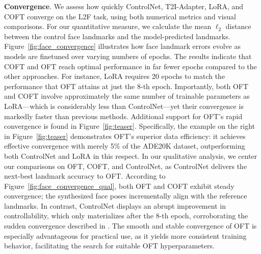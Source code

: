 \textbf{Convergence}. We assess how quickly ControlNet, T2I-Adapter, LoRA, and COFT converge on the L2F task, using both numerical metrics and visual comparisons. For our quantitative measure, we calculate the mean $\ell_2$ distance between the control face landmarks and the model-predicted landmarks. Figure~\ref{fig:face_convergence} illustrates how face landmark errors evolve as models are finetuned over varying numbers of epochs. The results indicate that COFT and OFT reach optimal performance in far fewer epochs compared to the other approaches. For instance, LoRA requires 20 epochs to match the performance that OFT attains at just the 8-th epoch. Importantly, both OFT and COFT involve approximately the same number of trainable parameters as LoRA—which is considerably less than ControlNet—yet their convergence is markedly faster than previous methods. Additional support for OFT's rapid convergence is found in Figure~\ref{fig:teaser}. Specifically, the example on the right in Figure~\ref{fig:teaser} demonstrates OFT's superior data efficiency: it achieves effective convergence with merely 5\% of the ADE20K dataset, outperforming both ControlNet and LoRA in this respect. In our qualitative analysis, we center our comparisons on OFT, COFT, and ControlNet, as ControlNet delivers the next-best landmark accuracy to OFT. According to Figure~\ref{fig:face_convergence_qual}, both OFT and COFT exhibit steady convergence; the synthesized face poses incrementally align with the reference landmarks. In contrast, ControlNet displays an abrupt improvement in controllability, which only materializes after the 8-th epoch, corroborating the sudden convergence described in \cite{zhang2023adding}. The smooth and stable convergence of OFT is especially advantageous for practical use, as it yields more consistent training behavior, facilitating the search for suitable OFT hyperparameters.

